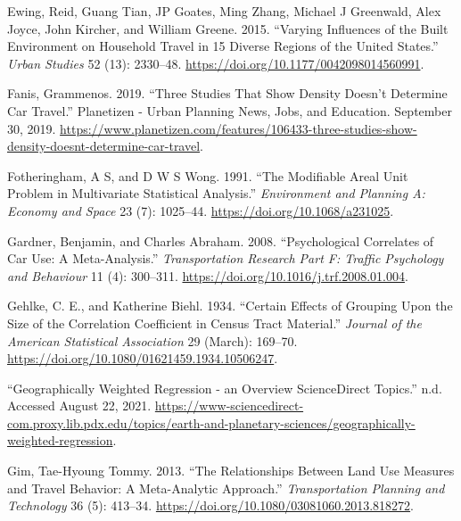\documentclass[
  11pt,
  openany]{memoir}
\newlength{\cslhangindent}
\newlength{\cslentryspacingunit} %
\newenvironment{CSLReferences}[2] %
 {%
  \setlength{\parindent}{0pt}
  \ifodd #1
  \let\oldpar\par
  \def\par{\hangindent=\cslhangindent\oldpar}
  \fi
  \setlength{\parskip}{#2\cslentryspacingunit}
 }%
 {}
\begin{document}
\begin{CSLReferences}{1}{0}
\leavevmode{}%
Ewing, Reid, Guang Tian, JP Goates, Ming Zhang, Michael J Greenwald, Alex Joyce, John Kircher, and William Greene. 2015. {``Varying Influences of the Built Environment on Household Travel in 15 Diverse Regions of the {United States}.''} \emph{Urban Studies} 52 (13): 2330--48. \url{https://doi.org/10.1177/0042098014560991}.

\leavevmode{}%
Fanis, Grammenos. 2019. {``Three {Studies That Show Density Doesn}'t {Determine Car Travel}.''} {Planetizen - Urban Planning News, Jobs, and Education}. September 30, 2019. \url{https://www.planetizen.com/features/106433-three-studies-show-density-doesnt-determine-car-travel}.

\leavevmode{}%
Fotheringham, A S, and D W S Wong. 1991. {``The {Modifiable Areal Unit Problem} in {Multivariate Statistical Analysis}.''} \emph{Environment and Planning A: Economy and Space} 23 (7): 1025--44. \url{https://doi.org/10.1068/a231025}.

\leavevmode{}%
Gardner, Benjamin, and Charles Abraham. 2008. {``Psychological Correlates of Car Use: A Meta-Analysis.''} \emph{Transportation Research Part F: Traffic Psychology and Behaviour} 11 (4): 300--311. \url{https://doi.org/10.1016/j.trf.2008.01.004}.

\leavevmode{}%
Gehlke, C. E., and Katherine Biehl. 1934. {``Certain {Effects} of {Grouping} Upon the {Size} of the {Correlation Coefficient} in {Census Tract Material}.''} \emph{Journal of the American Statistical Association} 29 (March): 169--70. \url{https://doi.org/10.1080/01621459.1934.10506247}.

\leavevmode{}%
{``Geographically {Weighted Regression} - an Overview \textbar{} {ScienceDirect Topics}.''} n.d. Accessed August 22, 2021. \url{https://www-sciencedirect-com.proxy.lib.pdx.edu/topics/earth-and-planetary-sciences/geographically-weighted-regression}.

\leavevmode{}%
Gim, Tae-Hyoung Tommy. 2013. {``The Relationships Between Land Use Measures and Travel Behavior: A Meta-Analytic Approach.''} \emph{Transportation Planning and Technology} 36 (5): 413--34. \url{https://doi.org/10.1080/03081060.2013.818272}.


\end{CSLReferences}
\end{document}
